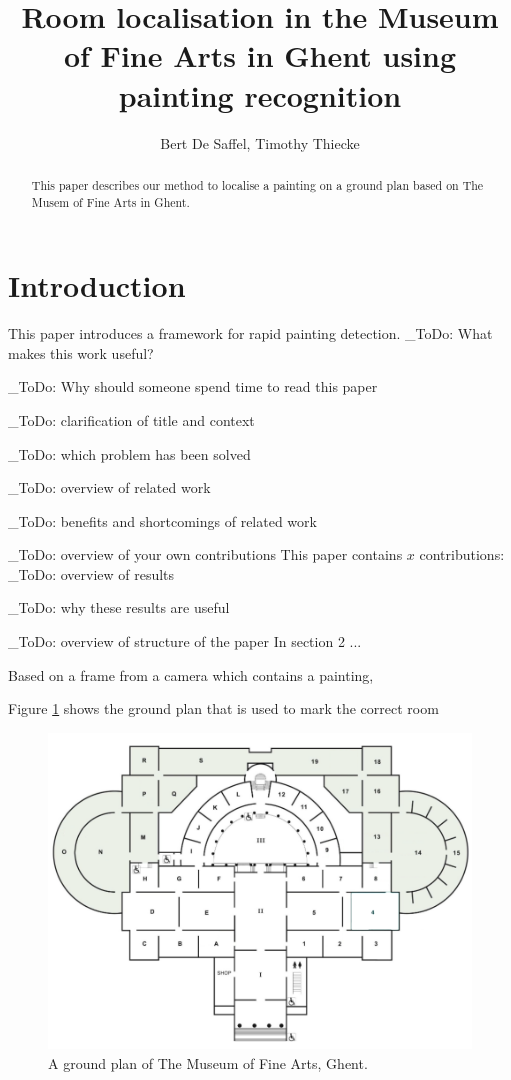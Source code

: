 \documentclass[10pt,final,journal]{IEEEtran}
\title{Room localisation in the Museum of Fine Arts in Ghent using painting recognition}
\author{Bert De Saffel, Timothy Thiecke}
\newcommand{\todo}[1]{\color{red}\_ToDo: #1 \color{black}}
\begin{document}
	\maketitle
	\begin{abstract}
		This paper describes our method to localise a painting on a ground plan based on The Musem of Fine Arts in Ghent. 
	\end{abstract}


	\section{Introduction}
	This paper introduces a framework for rapid painting detection.
	\todo{What makes this work useful?}
	
	\todo{Why should someone spend time to read this paper}
	
	\todo{clarification of title and context}
	
	\todo{which problem has been solved}
	
	\todo{overview of related work}
	
	\todo{benefits and shortcomings of related work}
	
	\todo{overview of your own contributions}
	This paper contains $x$ contributions:
	\todo{overview of results}
	
	\todo{why these results are useful}
	
	\todo{overview of structure of the paper}
	In section 2 ...

	
	Based on a frame from a camera which contains a painting, 
	
	Figure \ref{fig:groundplan_msk} shows the ground plan that is used to mark the correct room
	
	\begin{figure}
		\includegraphics[width=\linewidth]{groundplan_msk}
		\caption{A ground plan of The Museum of Fine Arts, Ghent. }
		\label{fig:groundplan_msk}
	\end{figure}
\end{document}
